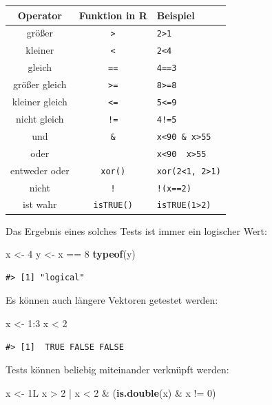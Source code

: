 \documentclass[]{tufte-book}
\newenvironment{Shaded}{}{}
\newcommand{\KeywordTok}[1]{\textcolor[rgb]{0.00,0.44,0.13}{\textbf{#1}}}
\newcommand{\DecValTok}[1]{\textcolor[rgb]{0.25,0.63,0.44}{#1}}
\newcommand{\StringTok}[1]{\textcolor[rgb]{0.25,0.44,0.63}{#1}}
\newcommand{\OperatorTok}[1]{\textcolor[rgb]{0.40,0.40,0.40}{#1}}
\newcommand{\NormalTok}[1]{#1}
\begin{document}
\begin{longtable}[]{@{}ccl@{}}
\toprule
Operator & Funktion in R & Beispiel\tabularnewline
\midrule
\endhead
größer & \texttt{\textgreater{}} &
\texttt{2\textgreater{}1}\tabularnewline
kleiner & \texttt{\textless{}} & \texttt{2\textless{}4}\tabularnewline
gleich & \texttt{==} & \texttt{4==3}\tabularnewline
größer gleich & \texttt{\textgreater{}=} &
\texttt{8\textgreater{}=8}\tabularnewline
kleiner gleich & \texttt{\textless{}=} &
\texttt{5\textless{}=9}\tabularnewline
nicht gleich & \texttt{!=} & \texttt{4!=5}\tabularnewline
und & \texttt{\&} &
\texttt{x\textless{}90\ \&\ x\textgreater{}55}\tabularnewline
oder & \texttt{\textbar{}} &
\texttt{x\textless{}90\ \textbar{}\ x\textgreater{}55}\tabularnewline
entweder oder & \texttt{xor()} &
\texttt{xor(2\textless{}1,\ 2\textgreater{}1)}\tabularnewline
nicht & \texttt{!} & \texttt{!(x==2)}\tabularnewline
ist wahr & \texttt{isTRUE()} &
\texttt{isTRUE(1\textgreater{}2)}\tabularnewline
\bottomrule
\end{longtable}

Das Ergebnis eines solches Tests ist immer ein logischer Wert:

\begin{Shaded}
\begin{Highlighting}[]
\NormalTok{x <-}\StringTok{ }\DecValTok{4}
\NormalTok{y <-}\StringTok{ }\NormalTok{x }\OperatorTok{==}\StringTok{ }\DecValTok{8}
\KeywordTok{typeof}\NormalTok{(y)}
\end{Highlighting}
\end{Shaded}

\begin{verbatim}
#> [1] "logical"
\end{verbatim}

Es können auch längere Vektoren getestet werden:

\begin{Shaded}
\begin{Highlighting}[]
\NormalTok{x <-}\StringTok{ }\DecValTok{1}\OperatorTok{:}\DecValTok{3}
\NormalTok{x }\OperatorTok{<}\StringTok{ }\DecValTok{2}
\end{Highlighting}
\end{Shaded}

\begin{verbatim}
#> [1]  TRUE FALSE FALSE
\end{verbatim}

Tests können beliebig miteinander verknüpft werden:

\begin{Shaded}
\begin{Highlighting}[]
\NormalTok{x <-}\StringTok{ }\NormalTok{1L}
\NormalTok{x }\OperatorTok{>}\StringTok{ }\DecValTok{2} \OperatorTok{|}\StringTok{ }\NormalTok{x }\OperatorTok{<}\StringTok{ }\DecValTok{2} \OperatorTok{&}\StringTok{ }\NormalTok{(}\KeywordTok{is.double}\NormalTok{(x) }\OperatorTok{&}\StringTok{ }\NormalTok{x }\OperatorTok{!=}\StringTok{ }\DecValTok{0}\NormalTok{)}
\end{Highlighting}
\end{Shaded}
\end{document}
